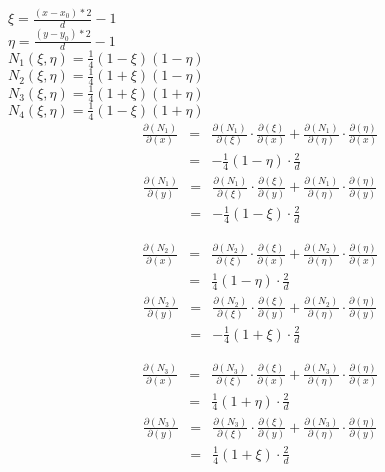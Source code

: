 \documentclass[fontset=windows]{ctexart}
\begin{document}
\begin{center}
	$\xi = \frac{(x-x_0)*2}{d} - 1 $\\
	$\eta = \frac{(y-y_0)*2}{d} -1 $\\
	$N_1(\xi,\eta) = \frac{1}{4}(1-\xi)(1-\eta)$\\
	$N_2(\xi,\eta) = \frac{1}{4}(1+\xi)(1-\eta)$\\
	$N_3(\xi,\eta) = \frac{1}{4}(1+\xi)(1+\eta)$\\
	$N_4(\xi,\eta) = \frac{1}{4}(1-\xi)(1+\eta)$\\

	\begin{eqnarray}
		\frac{\partial(N_1)}{\partial(x)} &=& \frac{\partial(N_1)}{\partial(\xi)}\cdot \frac{\partial(\xi)}{\partial(x)}+\frac{\partial(N_1)}{\partial(\eta)}\cdot\frac{\partial(\eta)}{\partial(x)}  \nonumber    \\
		~&=& -\frac{1}{4}(1-\eta)\cdot\frac{2}{d} \nonumber
		\label{eq:1}
	\end{eqnarray}
	\begin{eqnarray}
		\frac{\partial(N_1)}{\partial(y)} &=& \frac{\partial(N_1)}{\partial(\xi)}\cdot \frac{\partial(\xi)}{\partial(y)}+\frac{\partial(N_1)}{\partial(\eta)}\cdot\frac{\partial(\eta)}{\partial(y)}  \nonumber    \\
		~&=& -\frac{1}{4}(1-\xi)\cdot\frac{2}{d} \nonumber
	\end{eqnarray}

	\begin{eqnarray}
		\frac{\partial(N_2)}{\partial(x)} &=& \frac{\partial(N_2)}{\partial(\xi)}\cdot \frac{\partial(\xi)}{\partial(x)}+\frac{\partial(N_2)}{\partial(\eta)}\cdot\frac{\partial(\eta)}{\partial(x)}  \nonumber    \\
		~&=& \frac{1}{4}(1-\eta)\cdot\frac{2}{d} \nonumber
	\end{eqnarray}
	\begin{eqnarray}
		\frac{\partial(N_2)}{\partial(y)} &=& \frac{\partial(N_2)}{\partial(\xi)}\cdot \frac{\partial(\xi)}{\partial(y)}+\frac{\partial(N_2)}{\partial(\eta)}\cdot\frac{\partial(\eta)}{\partial(y)}  \nonumber    \\
		~&=& -\frac{1}{4}(1+\xi)\cdot\frac{2}{d} \nonumber
	\end{eqnarray}

	\begin{eqnarray}
		\frac{\partial(N_3)}{\partial(x)} &=& \frac{\partial(N_3)}{\partial(\xi)}\cdot \frac{\partial(\xi)}{\partial(x)}+\frac{\partial(N_3)}{\partial(\eta)}\cdot\frac{\partial(\eta)}{\partial(x)}  \nonumber    \\
		~&=& \frac{1}{4}(1+\eta)\cdot\frac{2}{d} \nonumber
	\end{eqnarray}
	\begin{eqnarray}
		\frac{\partial(N_3)}{\partial(y)} &=& \frac{\partial(N_3)}{\partial(\xi)}\cdot \frac{\partial(\xi)}{\partial(y)}+\frac{\partial(N_3)}{\partial(\eta)}\cdot\frac{\partial(\eta)}{\partial(y)}  \nonumber    \\
		~&=& \frac{1}{4}(1+\xi)\cdot\frac{2}{d} \nonumber
	\end{eqnarray}


\end{center}
\end{document}

